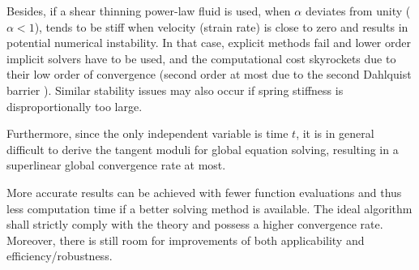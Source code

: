 \begin{enumerate}
Besides, if a shear thinning power-law fluid is used, when $\alpha$ deviates from unity ($\alpha<1$),  tends to be stiff when velocity (strain rate) is close to zero and results in potential numerical instability. In that case, explicit methods fail and lower order implicit solvers have to be used, and the computational cost skyrockets due to their low order of convergence (second order at most due to the second Dahlquist barrier \citep{Dahlquist1963}). Similar stability issues may also occur if spring stiffness is disproportionally too large.

Furthermore, since the only independent variable is time $t$, it is in general difficult to derive the tangent moduli for global equation solving, resulting in a superlinear global convergence rate at most.
\end{enumerate}
More accurate results can be achieved with fewer function evaluations and thus less computation time if a better solving method is available. The ideal algorithm shall strictly comply with the theory and possess a higher convergence rate. Moreover, there is still room for improvements of both applicability and efficiency/robustness.
